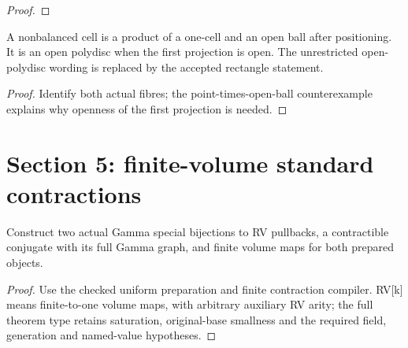 \begin{proof}


\leanok



\end{proof}

\begin{proposition}

\label{s4-rectangle}


\leanok

A nonbalanced cell is a product of a one-cell and an open ball after positioning. It is an open polydisc when the first projection is open. The unrestricted open-polydisc wording is replaced by the accepted rectangle statement.

\end{proposition}

\begin{proof}


\leanok

Identify both actual fibres; the point-times-open-ball counterexample explains why openness of the first projection is needed.

\end{proof}

\section{Section 5: finite-volume standard contractions}


\begin{lemma}

\label{s5-1}


\leanok

Construct two actual Gamma special bijections to RV pullbacks, a contractible conjugate with its full Gamma graph, and finite volume maps for both prepared objects.

\end{lemma}

\begin{proof}


\leanok

Use the checked uniform preparation and finite contraction compiler. RV[k] means finite-to-one volume maps, with arbitrary auxiliary RV arity; the full theorem type retains saturation, original-base smallness and the required field, generation and named-value hypotheses.

\end{proof}

